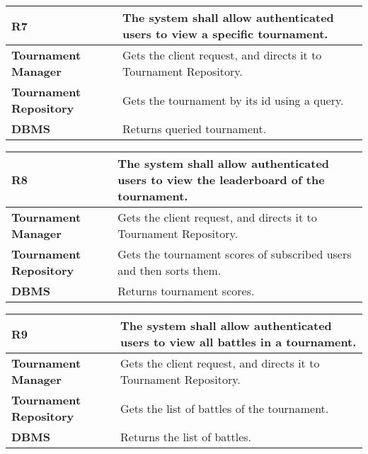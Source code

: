 \begin{table}[h!]
  \centering
  \begin{tabular}{lp{12cm}}
    \hline
    \textbf{R7} & The system shall allow authenticated users to view a specific tournament. \\
    \hline
    \hline
    \textbf{Tournament Manager} & Gets the client request, and directs it to Tournament Repository. \\
    \textbf{Tournament Repository} &  Gets the tournament by its id using a query.\\
    \textbf{DBMS} & Returns queried tournament. \\
    \hline
  \end{tabular}
\end{table}

\begin{table}[h!]
  \centering
  \begin{tabular}{lp{12cm}}
    \hline
    \textbf{R8} & The system shall allow authenticated users to view the leaderboard of the tournament. \\
    \hline
    \hline
    \textbf{Tournament Manager} & Gets the client request, and directs it to Tournament Repository. \\
    \textbf{Tournament Repository} &  Gets the tournament scores of subscribed users and then sorts them.\\
    \textbf{DBMS} & Returns tournament scores. \\
    \hline
  \end{tabular}
\end{table}

\begin{table}[h!]
  \centering
  \begin{tabular}{lp{12cm}}
    \hline
    \textbf{R9} & The system shall allow authenticated users to view all battles in a tournament. \\
    \hline
    \hline
    \textbf{Tournament Manager} & Gets the client request, and directs it to Tournament Repository. \\
    \textbf{Tournament Repository} &  Gets the list of battles of the tournament.\\
    \textbf{DBMS} & Returns the list of battles. \\
    \hline
  \end{tabular}
\end{table}

